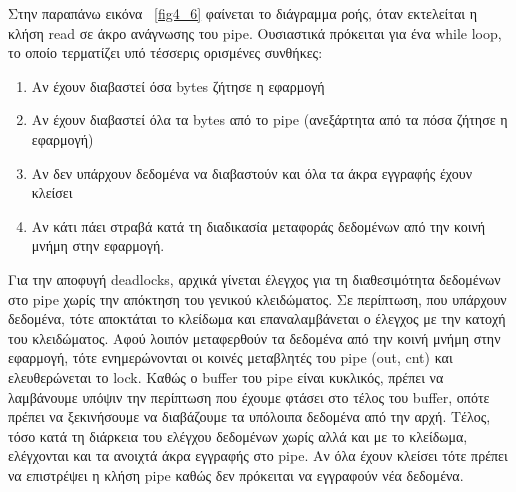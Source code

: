Στην παραπάνω εικόνα ~\ref{fig4_6} φαίνεται το διάγραμμα ροής, όταν εκτελείται η
κλήση read σε άκρο ανάγνωσης του pipe. Ουσιαστικά πρόκειται για ένα while loop,
το οποίο τερματίζει υπό τέσσερις ορισμένες συνθήκες:
\begin{enumerate}
	\item Αν έχουν διαβαστεί όσα bytes ζήτησε η εφαρμογή
	\item Αν έχουν διαβαστεί όλα τα bytes από το pipe (ανεξάρτητα από τα
		πόσα ζήτησε η εφαρμογή) 
	\item Αν δεν υπάρχουν δεδομένα να διαβαστούν και όλα τα άκρα εγγραφής
		έχουν κλείσει
	\item Αν κάτι πάει στραβά κατά τη διαδικασία μεταφοράς δεδομένων από την
		κοινή μνήμη στην εφαρμογή.
\end{enumerate}
Για την αποφυγή deadlocks, αρχικά γίνεται έλεγχος για τη διαθεσιμότητα δεδομένων
στο pipe χωρίς την απόκτηση του γενικού κλειδώματος. Σε περίπτωση, που υπάρχουν
δεδομένα, τότε αποκτάται το κλείδωμα και επαναλαμβάνεται ο έλεγχος με την κατοχή
του κλειδώματος. Αφού λοιπόν μεταφερθούν τα δεδομένα από την κοινή μνήμη στην
εφαρμογή, τότε ενημερώνονται οι κοινές μεταβλητές του pipe (out, cnt) και
ελευθερώνεται το lock. Καθώς ο buffer του pipe είναι κυκλικός, πρέπει να
λαμβάνουμε υπόψιν την περίπτωση που έχουμε φτάσει στο τέλος του buffer, οπότε
πρέπει να ξεκινήσουμε να διαβάζουμε τα υπόλοιπα δεδομένα από την αρχή. Τέλος,
τόσο κατά τη διάρκεια του ελέγχου δεδομένων χωρίς αλλά και με το κλείδωμα,
ελέγχονται και τα ανοιχτά άκρα εγγραφής στο pipe. Αν όλα έχουν κλείσει τότε
πρέπει να επιστρέψει η κλήση pipe καθώς δεν πρόκειται να εγγραφούν νέα δεδομένα.

